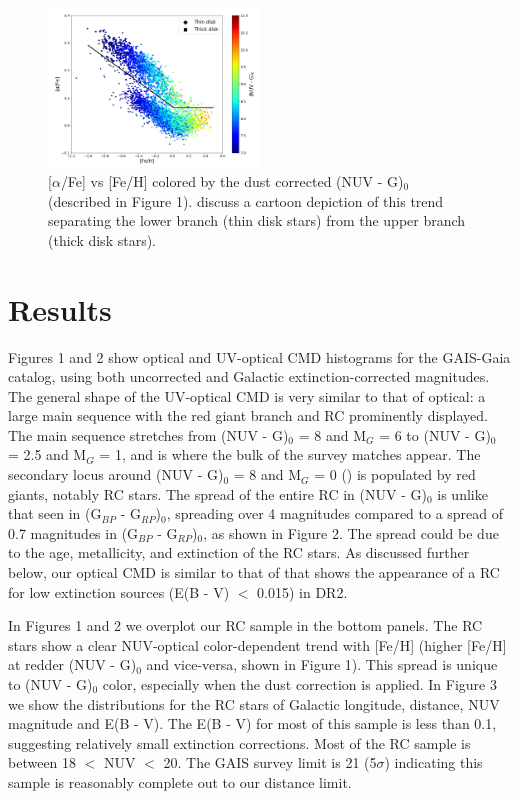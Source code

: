 \documentclass[twocolumn]{emulateapj}
\begin{document}
\begin{figure}[]
\centering
\includegraphics[width=0.5\textwidth]{f5.pdf}
\caption{[$\alpha$/Fe] vs [Fe/H] colored by the dust corrected (NUV - G)$_0$ (described in Figure 1). \citealt{hawkins15} discuss a cartoon depiction of this trend separating the lower branch (thin disk stars) from the upper branch (thick disk stars).}
\end{figure}

\section{Results}
Figures 1 and 2 show optical and UV-optical CMD histograms for the GAIS-Gaia catalog, using both uncorrected and Galactic extinction-corrected magnitudes. The general shape of the UV-optical CMD is very similar to that of optical: a large main sequence with the red giant branch and RC prominently displayed. The main sequence stretches from (NUV - G)$_0$ = 8 and M$_G$ = 6 to (NUV - G)$_0$ = 2.5 and M$_G$ = 1, and is where the bulk of the survey matches appear. The secondary locus around (NUV - G)$_0$ = 8 and M$_G$ = 0 (\citealt{hawkins17}) is populated by red giants, notably RC stars. The spread of the entire RC in (NUV - G)$_0$ is unlike that seen in (G$_{BP}$ - G$_{RP}$)$_0$, spreading over 4 magnitudes compared to a spread of 0.7 magnitudes in (G$_{BP}$ - G$_{RP}$)$_0$, as shown in Figure 2. The spread could be due to the age, metallicity, and extinction of the RC stars. As discussed further below, our optical CMD is similar to that of \citealt{gaiahrd} that shows the appearance of a RC for low extinction sources (E(B - V) $<$ 0.015) in DR2.

In Figures 1 and 2 we overplot our RC sample in the bottom panels. The RC stars show a clear NUV-optical color-dependent trend with [Fe/H] (higher [Fe/H] at redder (NUV - G)$_0$ and vice-versa, shown in Figure 1). This spread is unique to (NUV - G)$_0$ color, especially when the dust correction is applied. In Figure 3 we show the distributions for the RC stars of Galactic longitude, distance, NUV magnitude and E(B - V). The E(B - V) for most of this sample is less than 0.1, suggesting relatively small extinction corrections. Most of the RC sample is between 18 $<$ NUV $<$ 20. The GAIS survey limit is 21 (5$\sigma$) indicating this sample is reasonably complete out to our distance limit. 
\end{document}

